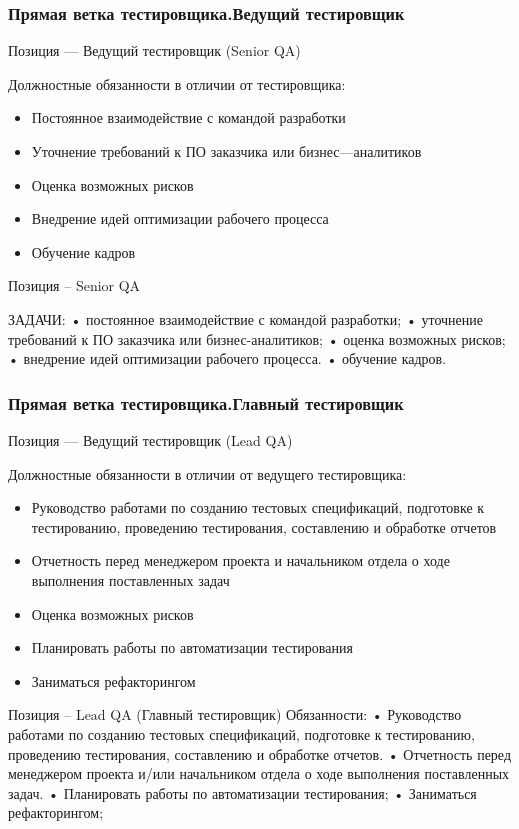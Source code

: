\documentclass{../industrial-development}
\begin{document}
\begin{frame} \frametitle{Прямая ветка тестировщика.Ведущий тестировщик}
 \begin{block}{}
  \alert{Позиция --- Ведущий тестировщик (Senior QA)}

Должностные обязанности в отличии от тестировщика: 
  \end{block}
  \begin{itemize}
  \item Постоянное взаимодействие с командой разработки
  \item Уточнение требований к ПО заказчика или бизнес---аналитиков
  \item Оценка возможных рисков
 \item Внедрение идей оптимизации рабочего процесса
 \item Обучение кадров
  \end{itemize}
\end{frame}

\lecturenotes
Позиция – Senior QA

ЗАДАЧИ:
•	постоянное взаимодействие с командой разработки;
•	уточнение требований к ПО заказчика или бизнес-аналитиков;
•	оценка возможных рисков;
•	внедрение идей оптимизации рабочего процесса.
•	обучение кадров.


\begin{frame} \frametitle{Прямая ветка тестировщика.Главный тестировщик}
 \begin{block}{}
  \alert{Позиция --- Ведущий тестировщик (Lead QA)}

Должностные обязанности в отличии от ведущего тестировщика: 
  \end{block}
  \begin{itemize}
  \item Руководство работами по созданию тестовых спецификаций, подготовке к тестированию, проведению тестирования, составлению и обработке отчетов
  \item Отчетность перед менеджером проекта и начальником отдела о ходе выполнения поставленных задач
  \item Оценка возможных рисков
 \item Планировать работы по автоматизации тестирования
 \item Заниматься рефакторингом
  \end{itemize}
\end{frame}

\lecturenotes
Позиция – Lead QA (Главный тестировщик)
Обязанности:
•	Руководство работами по созданию тестовых спецификаций, подготовке к тестированию, проведению тестирования, составлению и обработке отчетов.
•	Отчетность перед менеджером проекта и/или начальником отдела о ходе выполнения поставленных задач.
•	Планировать работы по автоматизации тестирования;
•	Заниматься рефакторингом;
\end{document}
